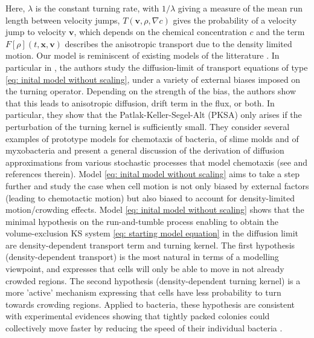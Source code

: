 \documentclass[review,onefignum,onetabnum]{siamart220329}
\newcommand{\DP}{\color{myblue}}
\begin{document}
Here, $\lambda$ is the constant turning rate, with $1/\lambda$ giving a measure of the mean run length between velocity jumps, $T(\mathbf{v},\rho,\nabla c)$ gives the probability of a velocity jump to velocity $\mathbf{v}$, which depends on the chemical concentration $c$ and the term $F[\rho](t,\mathbf{x},\mathbf{v})$ describes the anisotropic transport due to the density limited motion. {\DP Our model is reminiscent of existing models of the litterature \cite{othmer2002diffusion,othmer2000diffusion}. In particular in \cite{othmer2002diffusion}, the authors study the diffusion-limit of transport equations of type \eqref{eq: inital model without scaling}, under a variety of external biases imposed on the turning operator. Depending on the strength of the bias, the authors show that this leads to anisotropic diffusion, drift term in the flux, or both. In particular, they show that the Patlak-Keller-Segel-Alt (PKSA) only arises if the perturbation of the turning kernel is sufficiently small. They consider several examples of prototype models for chemotaxis of bacteria, of slime molds and of myxobacteria and present a general discussion of the derivation of diffusion approximations from various stochastic processes that model chemotaxis (see \cite{othmer2000diffusion} and references therein). Model \eqref{eq: inital model without scaling} aims to take a step further and study the case when cell motion is not only biased by external factors (leading to chemotactic motion) but also biased to account for density-limited motion/crowding effects. Model \eqref{eq: inital model without scaling} shows that the minimal hypothesis on the run-and-tumble process enabling to obtain the volume-exclusion KS system \eqref{eq: starting model equation} in the diffusion limit are density-dependent transport term and turning kernel. The first hypothesis (density-dependent transport) is the most natural in terms of a modelling viewpoint, and expresses that cells will only be able to move in not already crowded regions. The second hypothesis (density-dependent turning kernel) is a more 'active' mechanism expressing that cells have less probability to turn towards crowding regions. Applied to bacteria, these hypothesis are consistent with experimental evidences showing that tightly packed colonies could collectively move faster by reducing the speed of their individual bacteria \cite{Meacock2021}.} 
\end{document}
